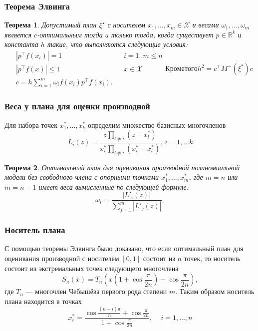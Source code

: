 \documentclass[unicode, notheorems, minimal, nologo]{beamer}
\newtheorem{theorem}{Теорема}
\newcommand\abs[1]{\left\lvert#1\right\rvert}
\begin{document}
\begin{frame}
	\frametitle{Теорема Элвинга \citep{melas2010}}
	\begin{theorem}
	Допустимый план $\xi^\star$ с носителем $x_1, \ldots, x_m \in \mathcal{X}$ и весами $\omega_1, \ldots, \omega_m$ является $c$-оптимальным тогда и только тогда, когда существует $p \in \mathbb{R}^k$ и константа $h$ такие, что выполняются следующие условия:
  \begin{subequations}
  \label{eq:elfving}
  \begin{align}
	&\abs{p^\top f(x_i)} = 1 &&i=1..m \leqslant n \\
	&\abs{p^\top f(x)} \leqslant 1  &&x \in \mathcal{X} \\
	&c = h \sum_{i=1}^m \omega_i f(x_i) p^\top f(x_i) .
  \end{align}
  Кроме того
  \begin{equation*}
  	h^2 = c^\top M^{-}(\xi^{*})c
  \end{equation*}
  \end{subequations}
	\end{theorem}
\end{frame}

\begin{frame}
	\frametitle{Веса у плана для оценки производной \citep{melasmain}}
	Для набора точек $x_1^*, \ldots, x_k^*$ определим множество базисных многочленов
	\begin{equation*}
		L_i(z) = \frac{z \prod_{l \neq i} (z - x_l^*)}{x_i^* \prod_{l \neq i} (x_i^* - x_l^*)}, \, i = 1, \dots k
	\end{equation*}
	
	\begin{theorem}
		Оптимальный план для оценивания производной полиномиальной модели без свободного члена с опорными точками $x_1^*, \ldots, x_m^*$, где $m=n$ или $m=n-1$ имеет веса вычисленные по следующей формуле:	
	\begin{equation*}
		\omega_i = \frac{\abs{L'_i(z)}}{\sum_{j=1}^m \abs{L'_j(z)}},
	\end{equation*}
	\end{theorem}
\end{frame}

\begin{frame}
	\frametitle{Носитель плана}
	С помощью теоремы Элвинга было доказано, что если оптимальный план для оценивания производной с носителем $[0, 1]$ состоит из $n$ точек, то носитель состоит из экстремальных точек следующего многочлена
	\begin{equation*}
		S_n(x) = T_n \left(x \left(1 + \cos \frac{\pi}{2n} \right) - \cos \frac{\pi}{2n} \right),
	\end{equation*}
	где $T_n$ --- многочлен Чебышёва первого рода степени $m$. Таким образом носитель плана находится в точках
	\begin{equation*}
		x_i^* = \frac{\cos \frac{(n - i) \pi}{n} + \cos \frac{\pi}{2n}}{1 + \cos \frac{\pi}{2n}} , \, \quad i = 1, \ldots, n
	\end{equation*}
\end{frame}
\end{document}
